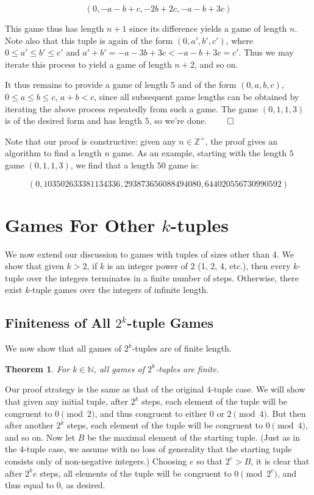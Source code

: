 \documentclass[12pt]{amsart}
\newtheorem{theorem}{Theorem}[section]
\newcommand{\znn}{\mathbb{N}}
\newcommand{\zp}{\mathbb{Z}^+}
\begin{document}
$$(0, -a - b + c, -2b + 2c, -a - b + 3c)$$

This game thus has length $n + 1$ since its difference yields a game of length $n$. Note also that this tuple is again of the form $(0, a', b', c')$, where $0\leq a'\leq b'\leq c'$ and $a' + b' = -a - 3b + 3c < -a - b + 3c = c'$. Thus we may iterate this process to yield a game of length $n + 2$, and so on.

It thus remains to provide a game of length $5$ and of the form $(0, a, b, c)$, $0\leq a\leq b\leq c$, $a + b < c$, since all subsequent game lengths can be obtained by iterating the above process repeatedly from such a game. The game $(0, 1, 1, 3)$ is of the desired form and has length $5$, so we're done. $\qed$

Note that our proof is constructive: given any $n\in \zp$, the proof gives an algorithm to find a length $n$ game. As an example, starting with the length $5$ game $(0, 1, 1, 3)$, we find that a length $50$ game is:

$$(0, 103502633381134336, 293873656088494080, 644020556730990592)$$

\section{Games For Other $k$-tuples\label{sec:othertuples}}

We now extend our discussion to games with tuples of sizes other than 4. We show that given $k > 2$, if $k$ is an integer power of $2$ (1, 2, 4, etc.), then every $k$-tuple over the integers terminates in a finite number of steps. Otherwise, there exist $k$-tuple games over the integers of infinite length.

\subsection{Finiteness of All $2^k$-tuple Games}

We now show that all games of $2^k$-tuples are of finite length.

\begin{theorem}
For $k\in \znn$, all games of $2^k$-tuples are finite.
\end{theorem}

Our proof strategy is the same as that of the original $4$-tuple case. We will show that given any initial tuple, after $2^k$ steps, each element of the tuple will be congruent to $0\pmod{2}$, and thus congruent to either $0$ or $2\pmod{4}$. But then after another $2^k$ steps, each element of the tuple will be congruent to $0\pmod{4}$, and so on. Now let $B$ be the maximal element of the starting tuple. (Just as in the $4$-tuple case, we assume with no loss of generality that the starting tuple consists only of non-negative integers.) Choosing $e$ so that $2^e>B$, it is clear that after $2^ke$ steps, all elements of the tuple will be congruent to $0\pmod{2^e}$, and thus equal to $0$, as desired.
\end{document}
